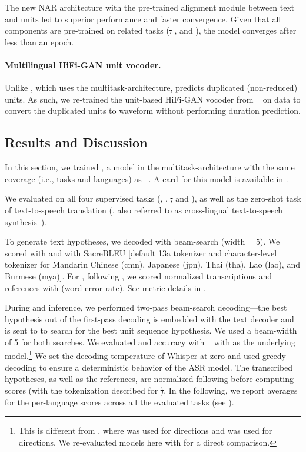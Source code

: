The new NAR \tu architecture with the pre-trained alignment module between text and units led to superior performance and faster convergence. Given that all components are pre-trained on related tasks (\st, \asr, and \tu), the model converges after less than an epoch. 

\paragraph{Multilingual HiFi-GAN unit vocoder.}\label{sec:offline:vocoder}

Unlike \mfourt, which uses the multitask-\unity architecture, \mfourttwo predicts duplicated (non-reduced) units.
As such, we re-trained the unit-based HiFi-GAN vocoder from \mfourt~\citep{SeamlessM4TArXiv,gong2023multilingual} on \asr data to convert the duplicated units to waveform without performing duration prediction.

\subsection{Results and Discussion}\label{sec:offline:results}
In this section, we trained \mfourtlgtwo, a \sizelg model in the multitask-\unitytwo architecture with the same coverage (i.e., tasks and languages) as \mfourt~\citep{SeamlessM4TArXiv}. A card for this model is available in .

We evaluated \mfourtlgtwo on all four supervised tasks (\mt, \asr, \st, and \sst), as well as the zero-shot task of text-to-speech translation (\ttst, also referred to as cross-lingual text-to-speech synthesis~\citep{valle-x}).

To generate text hypotheses, we decoded with beam-search (width${=}5$).
We scored \mt with \chrfT{} 
and \st with SacreBLEU [default 13a tokenizer and character-level tokenizer for Mandarin Chinese (cmn), Japanese (jpn), Thai (tha), Lao (lao), and Burmese (mya)].
For \asr, following \citet{whisper}, we scored normalized transcriptions and references with \wer (word error rate). See metric details in .

During \sst and \ttst inference, we performed two-pass beam-search decoding—the best hypothesis out of the first-pass decoding is embedded with the text decoder and is sent to \tu to search for the best unit sequence hypothesis. We used a beam-width of 5 for both searches.
We evaluated \sst and \ttst accuracy with \asrbleu~\citep{lee-etal-2022-direct} with \whisperlargeold as the underlying \asr model.\footnote{This is different from \citet{SeamlessM4TArXiv}, where \whisperlarge was used for \engx directions and \whispermedium was used for \xeng directions. We re-evaluated \mfourt models here with \whisperlargeold for a direct comparison.}
We set the decoding temperature of Whisper at zero and used greedy decoding to ensure a deterministic behavior of the ASR model.
The transcribed hypotheses, as well as the references, are normalized following \citep{whisper} before computing \bleu scores (with the tokenization described for \st). In the following, we report averages for the per-language scores across all the evaluated tasks (see ).


